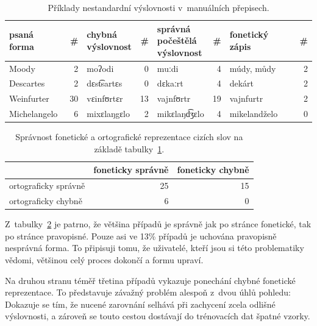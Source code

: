 \begin{table}[htpb]
\begin{center}
\begin{tabular}{|l r|l r|l r|l r|}
\hline
psaná forma                     & \#
    & \makecell{chybná\\ výslovnost} & \#
        & \makecell{správná\\ počeštělá\\ výslovnost}  & \#
            & fonetický zápis               & \# \\
\hline
Moody & 2 & moʔodi & 0 & muːdi & 4 & múdy, můdy & 2 \\
Descartes & 2 & dɛst͡sartɛs  & 0 & dɛkaːrt & 4 & dekárt & 2   \\
Weinfurter & 30 & vɛinfʊrtɛr & 13 & vajnfʊrtr & 19 & vajnfurtr & 2 \\
Michelangelo & 6 & mixɛlaŋgɛlo & 2 & mikɛlaŋd͡ʒɛlo  & 4 & mikelandželo & 0 \\
\hline
\end{tabular}
\caption{Příklady nestandardní výslovnosti v~manuálních přepisech.}
\label{tab:eval-pronunc}
\end{center}
\end{table}

\begin{table}[htpb]
\begin{center}
\begin{tabular}{|l|r|r|}
\hline
 & foneticky správně & foneticky chybně \\
\hline
ortograficky správně & 25 & 15 \\
\hline
ortograficky chybně & 6 & 0 \\
\hline
\end{tabular}
\caption{Správnost fonetické a ortografické reprezentace cizích slov na základě
tabulky~\ref{tab:eval-pronunc}.}
\label{tab:pronunc-rate}
\end{center}
\normalfont
\end{table}

Z~tabulky~\ref{tab:pronunc-rate} je patrno, že většina případů je správně jak
po stránce fonetické, tak po stránce pravopisné. Pouze asi ve 13\% případů je
uchována pravopisně nesprávná forma. To připisuji tomu, že uživatelé, kteří jsou
si této problematiky vědomi, většinou celý proces dokončí a formu upraví.

Na druhou stranu téměř třetina případů vykazuje ponechání chybné fonetické
reprezentace. To představuje závažný problém alespoň z~dvou úhlů pohledu:
Dokazuje se tím, že nucené zarovnání selhává při zachycení zcela odlišné
výslovnosti, a zároveň se touto cestou dostávají do trénovacích dat špatné
vzorky.

